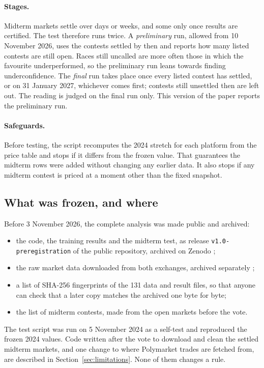 \paragraph{Stages.} Midterm markets settle over days or weeks, and some only once results are certified. The test
therefore runs twice. A \emph{preliminary} run, allowed from 10 November 2026, uses the contests settled by then and
reports how many listed contests are still open. Races still uncalled are more often those in which the favourite
underperformed, so the preliminary run leans towards finding underconfidence. The \emph{final} run takes place once
every listed contest has settled, or on 31 January 2027, whichever comes first; contests still unsettled then are left
out. The reading is judged on the final run only. This version of the paper reports the preliminary run.

\paragraph{Safeguards.} Before testing, the script recomputes the 2024 stretch for each platform from the price table
and stops if it differs from the frozen value. That guarantees the midterm rows were added without changing any earlier
data. It also stops if any midterm contest is priced at a moment other than the fixed snapshot.

\subsection{What was frozen, and where}

Before 3 November 2026, the complete analysis was made public and archived:
\begin{itemize}
  \item the code, the training results and the midterm test, as release \texttt{v1.0-preregistration} of the public
        repository, archived on Zenodo \citep{kirillov2026code};
  \item the raw market data downloaded from both exchanges, archived separately \citep{kirillov2026data};
  \item a list of SHA-256 fingerprints of the 131 data and result files, so that anyone can check that a later copy
        matches the archived one byte for byte;
  \item the list of midterm contests, made from the open markets before the vote.
\end{itemize}
The test script was run on 5 November 2024 as a self-test and reproduced the frozen 2024 values. Code written after the vote to
download and clean the settled midterm markets, and one change to where Polymarket trades are fetched from, are
described in Section~\ref{sec:limitations}. None of them changes a rule.

